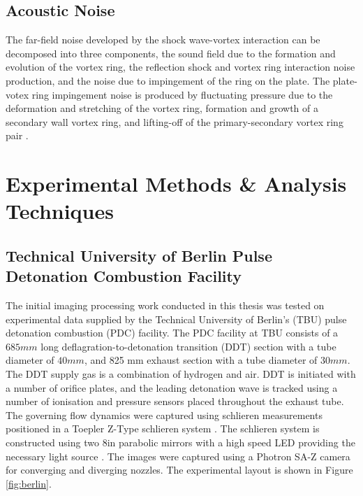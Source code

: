 \subsection{Acoustic Noise}
The far-field noise developed by the shock wave-vortex interaction can be decomposed into three components, the sound field due to the formation and evolution of the vortex ring, the reflection shock and vortex ring interaction noise production, and the noise due to impingement of the ring on the plate. The plate-votex ring impingement noise is produced by fluctuating pressure due to the deformation and stretching of the vortex ring, formation and growth of a secondary wall vortex ring, and lifting-off of the primary-secondary vortex ring pair \cite{murugan2010characteristics}.


\newpage
\section{Experimental Methods \& Analysis Techniques}
\subsection{Technical University of Berlin Pulse Detonation Combustion Facility}
The initial imaging processing work conducted in this thesis was tested on experimental data supplied by the Technical University of Berlin's (TBU) pulse detonation combustion (PDC) facility. The PDC facility at TBU consists of a $685mm$ long deflagration-to-detonation transition (DDT) section with a tube diameter of $40mm$, and 825 mm exhaust section with a tube diameter of $30mm$. The DDT supply gas is a combination of hydrogen and air. DDT is initiated with a number of orifice plates, and the leading detonation wave
is tracked using a number of ionisation and pressure sensors placed throughout the exhaust tube. The governing flow dynamics were captured using schlieren measurements positioned in a Toepler Z-Type schlieren system \citep{settles2001schlieren}. The schlieren system is constructed using two 8in parabolic mirrors with a high speed LED providing the necessary light source \citep{willert2012assessment}. The images were captured using a Photron SA-Z camera for converging and diverging nozzles. The experimental layout is shown in Figure \ref{fig:berlin}.

